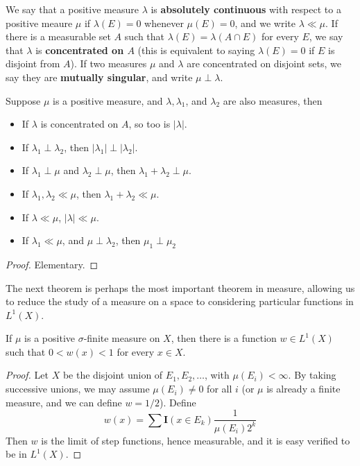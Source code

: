 We say that a positive measure $\lambda$ is {\bf absolutely continuous} with respect to a positive meaure $\mu$ if $\lambda(E) = 0$ whenever $\mu(E) = 0$, and we write $\lambda \ll \mu$. If there is a measurable set $A$ such that $\lambda(E) = \lambda(A \cap E)$ for every $E$, we say that $\lambda$ is {\bf concentrated on $A$} (this is equivalent to saying $\lambda(E) = 0$ if $E$ is disjoint from $A$). If two measures $\mu$ and $\lambda$ are concentrated on disjoint sets, we say they are {\bf mutually singular}, and write $\mu \perp \lambda$.

\begin{theorem}
    Suppose $\mu$ is a positive measure, and $\lambda, \lambda_1$, and $\lambda_2$ are also measures, then
    \begin{itemize}
        \item If $\lambda$ is concentrated on $A$, so too is $|\lambda|$.
        \item If $\lambda_1 \perp \lambda_2$, then $|\lambda_1| \perp |\lambda_2|$.
        \item If $\lambda_1 \perp \mu$ and $\lambda_2 \perp \mu$, then $\lambda_1 + \lambda_2 \perp \mu$.
        \item If $\lambda_1, \lambda_2 \ll \mu$, then $\lambda_1 + \lambda_2 \ll \mu$.
        \item If $\lambda \ll \mu$, $|\lambda| \ll \mu$.
        \item If $\lambda_1 \ll \mu$, and $\mu \perp \lambda_2$, then $\mu_1 \perp \mu_2$
    \end{itemize}
\end{theorem}
\begin{proof}
    Elementary.
\end{proof}

The next theorem is perhaps the most important theorem in measure, allowing us to reduce the study of a measure on a space to considering particular functions in $L^1(X)$.

\begin{lemma}
    If $\mu$ is a positive $\sigma$-finite measure on $X$, then there is a function $w \in L^1(X)$ such that $0 < w(x) < 1$ for every $x \in X$.
\end{lemma}
\begin{proof}
    Let $X$ be the disjoint union of $E_1, E_2, \dots$, with $\mu(E_i) < \infty$. By taking successive unions, we may assume $\mu(E_i) \neq 0$ for all $i$ (or $\mu$ is already a finite measure, and we can define $w = 1/2$). Define
    \[ w(x) = \sum \mathbf{I}(x \in E_k) \frac{1}{\mu(E_i) 2^k} \]
    Then $w$ is the limit of step functions, hence measurable, and it is easy verified to be in $L^1(X)$.
\end{proof}

